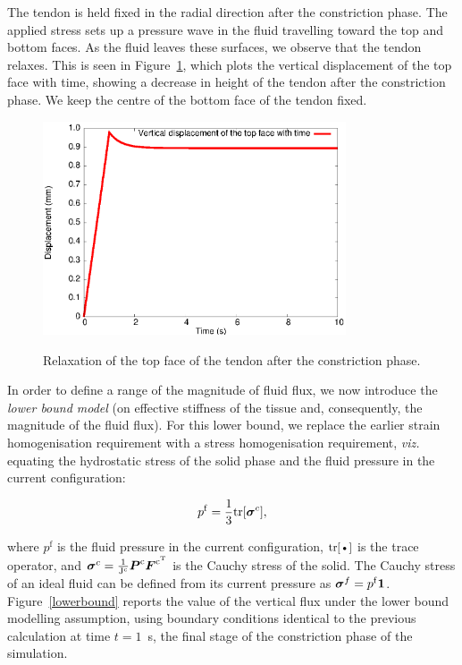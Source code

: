 The tendon is held fixed in the radial direction after the
constriction phase. The applied stress sets up a pressure wave in the
fluid travelling toward the top and bottom faces. As the fluid leaves
these surfaces, we observe that the tendon relaxes. This is seen in
Figure~\ref{topdisp}, which plots the vertical displacement of the top
face with time, showing a decrease in height of the tendon after the
constriction phase. We keep the centre of the bottom face of the
tendon fixed.

\begin{figure}[!hpt]
  \centering
      {\includegraphics[width=0.8\textwidth]{images/examples/lagrangian/constriction/top-vertical-displacement}}
      \caption{Relaxation of the top face of the tendon after the
      constriction phase.}
      \label{topdisp}
\end{figure}

In order to define a range of the magnitude of fluid flux, we now
introduce the {\em lower bound model} (on effective stiffness of the
tissue and, consequently, the magnitude of the fluid flux). For this lower bound, we
replace the earlier strain homogenisation requirement with a stress
homogenisation requirement, {\em viz.} equating the hydrostatic stress
of the solid phase and the fluid pressure in the current
configuration:

\begin{equation}
p^{\mathrm{f}}=\frac{1}{3} \mathrm{\small{tr}}[\mbox{\boldmath$\sigma$}^{c}],
\label{equalpr}
\end{equation}

\noindent where $p^{\mathrm{f}}$ is the fluid pressure in the current
configuration, $\mbox{\small{tr}[\textbullet]}$ is the trace operator, and
$\mbox{\boldmath$\sigma$}^{c}=\frac{1}{\mathrm{J^{c}}} \mbox{\boldmath$ P$}^{\mathrm{c}}
\mbox{\boldmath$ F$}^{\mathrm{c}^{\mathrm{T}}}$ is the Cauchy stress of the solid. The
Cauchy stress of an ideal fluid can be defined from its current
pressure as \mbox{$\mbox{\boldmath$\sigma$}^{f}= p^{\mathrm{f}} {\bf 1}$.}
Figure~{\ref{lowerbound}} reports the value of the vertical flux under
the lower bound modelling assumption, using boundary conditions identical to the
previous calculation at time $t=1$~s, the final stage of the
constriction phase of the simulation. 


